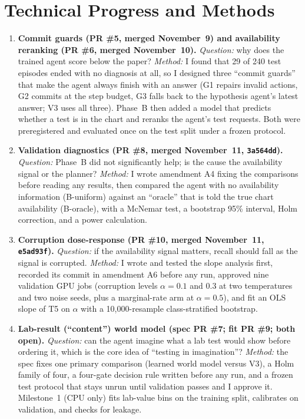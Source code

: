 \documentclass[11pt,letterpaper]{article}
\begin{document}
\section{Technical Progress and Methods}
\begin{enumerate}
  \item \textbf{Commit guards (PR \#5, merged November~9) and availability reranking (PR \#6, merged November~10).} \emph{Question:} why does the trained agent score below the paper? \emph{Method:} I found that 29 of 240 test episodes ended with no diagnosis at all, so I designed three ``commit guards'' that make the agent always finish with an answer (G1 repairs invalid actions, G2 commits at the step budget, G3 falls back to the hypothesis agent's latest answer; V3 uses all three). Phase~B then added a model that predicts whether a test is in the chart and reranks the agent's test requests. Both were preregistered and evaluated once on the test split under a frozen protocol.
  \item \textbf{Validation diagnostics (PR \#8, merged November~11, \texttt{3a564dd}).} \emph{Question:} Phase~B did not significantly help; is the cause the availability signal or the planner? \emph{Method:} I wrote amendment A4 fixing the comparisons before reading any results, then compared the agent with no availability information (B-uniform) against an ``oracle'' that is told the true chart availability (B-oracle), with a McNemar test, a bootstrap 95\% interval, Holm correction, and a power calculation.
  \item \textbf{Corruption dose-response (PR \#10, merged November~11, \texttt{e5ad93f}).} \emph{Question:} if the availability signal matters, recall should fall as the signal is corrupted. \emph{Method:} I wrote and tested the slope analysis first, recorded its commit in amendment A6 before any run, approved nine validation GPU jobs (corruption levels $\alpha = 0.1$ and $0.3$ at two temperatures and two noise seeds, plus a marginal-rate arm at $\alpha = 0.5$), and fit an OLS slope of T5 on $\alpha$ with a 10{,}000-resample class-stratified bootstrap.
  \item \textbf{Lab-result (``content'') world model (spec PR \#7; fit PR \#9; both open).} \emph{Question:} can the agent imagine what a lab test would show before ordering it, which is the core idea of ``testing in imagination''? \emph{Method:} the spec fixes one primary comparison (learned world model versus V3), a Holm family of four, a four-gate decision rule written before any run, and a frozen test protocol that stays unrun until validation passes and I approve it. Milestone~1 (CPU only) fits lab-value bins on the training split, calibrates on validation, and checks for leakage.
\end{enumerate}
\end{document}
